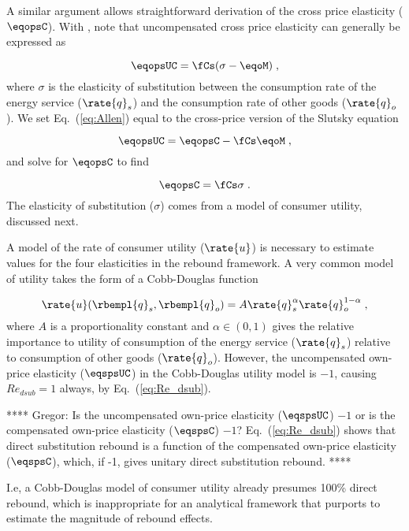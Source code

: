 A similar argument allows straightforward derivation 
of the cross price elasticity ($\eqopsC$).
With \citet{Hicks1934}, 
note that uncompensated cross price elasticity can generally be expressed as

\begin{equation} \label{eq:Allen}
  \eqopsUC = \fCs (\sigma - \eqoM) \; ,
\end{equation}
%
where $\sigma$ is the elasticity of substitution 
between the consumption rate of the energy service ($\rate{q}_s$) and
the consumption rate of other goods ($\rate{q}_o$). 
We set Eq.~(\ref{eq:Allen}) equal to 
the cross-price version of the Slutsky equation

\begin{equation} \label{eq:slutsky_cross}
  \eqopsUC = \eqopsC - \fCs \eqoM \; ,
\end{equation}
%
and solve for $\eqopsC$ to find

\begin{equation} \label{eq:eqops_general}
  \eqopsC = \fCs \sigma \; .
\end{equation}
%
The elasticity of substitution ($\sigma$)
comes from a model of consumer utility, discussed next.

A model of the rate of consumer utility ($\rate{u}$)
is necessary to estimate values for the four elasticities
in the rebound framework.
A very common model of utility takes the form of a Cobb-Douglas function

\begin{equation} \label{eq:CD_utility}
  \rate{u}(\rbempl{q}_s,\rbempl{q}_o) = A \rate{q}_s^\alpha \rate{q}_o^{1 - \alpha} \; ,
\end{equation}
%
where $A$ is a proportionality constant and 
$\alpha \in (0,1)$ gives the relative importance to utility 
of consumption of the energy service ($\rate{q}_s$)
relative to consumption of other goods ($\rate{q}_o$). 
However, the uncompensated own-price elasticity ($\eqspsUC$) 
in the Cobb-Douglas utility model is $-1$, 
causing $Re_{dsub} = 1$ always,
by Eq.~(\ref{eq:Re_dsub}).

**** Gregor: Is the uncompensated own-price elasticity ($\eqspsUC$) $-1$ 
or is the compensated own-price elasticity ($\eqspsC$) $-1$?
Eq.~(\ref{eq:Re_dsub}) shows that direct substitution rebound is a function of the 
compensated own-price elasticity ($\eqspsC$), which, if -1, gives unitary direct substitution rebound.
****

I.e, a Cobb-Douglas model of consumer utility already presumes 100\% direct rebound,
which is inappropriate for an analytical framework that purports to 
estimate the magnitude of rebound effects.

